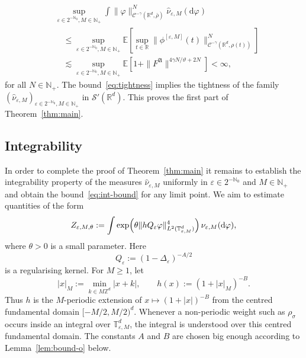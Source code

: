 \documentclass{article}
\numberwithin{equation}{section}
\newcommand{\assign}{:=}
\newcommand{\mathd}{\mathrm{d}}
\theoremstyle{plain}
\theoremstyle{definition}
\begin{document}
\begin{equation}
  \begin{aligned}
    &\sup_{\varepsilon \in 2^{-\mathbb{N}_0}, M \in \mathbb{N}_+}
    \int \| \varphi \|_{\mathcal{C}^{- \gamma}
    (\mathbb{R}^d, \bar{\rho})}^N
    \hat{\nu}_{\varepsilon, M}(\mathd \varphi)\\
    &\quad\leqslant
    \sup_{\varepsilon \in 2^{-\mathbb{N}_0}, M \in \mathbb{N}_+}
    \mathbb{E} \left[\sup_{t \in \mathbb{R}}
    \| \phi^{[\varepsilon, M]} (t) \|_{\mathcal{C}^{- \gamma}
    (\mathbb{R}^d, \rho (t))}^N\right]\\
    &\quad \lesssim
    \sup_{\varepsilon \in 2^{-\mathbb{N}_0}, M \in \mathbb{N}_+}
    \mathbb{E} \left[1 + \| F^{\mathfrak{A}} \|^{4 \gamma N / \vartheta + 2 N}\right]
    < \infty,
  \end{aligned}
  \label{eq:tightness}
\end{equation}
for all $N \in \mathbb{N}_+$. The bound~\eqref{eq:tightness} implies the
tightness of the family $(\hat{\nu}_{\varepsilon, M})_{\varepsilon \in
2^{-\mathbb{N}_0}, M \in \mathbb{N}_+}$ in $\mathcal{S}' (\mathbb R^d)$. This
proves the first part of Theorem~\ref{thm:main}.

\subsection{Integrability}\label{sec:integrability}

In order to complete the proof of Theorem~\ref{thm:main} it remains to
establish the integrability property of the measures
$\hat{\nu}_{\varepsilon, M}$ uniformly in $\varepsilon \in 2^{-\mathbb N_0}$ and $M
\in \mathbb{N}_+$ and obtain the bound~\eqref{eq:int-bound} for any limit
point. We aim to estimate quantities of the form
\[ Z_{\varepsilon, M, \theta} \assign \int \exp\Bigl(\theta \| hQ_{\varepsilon}
\varphi \|_{L^2 (\mathbb{T}^d_{\varepsilon, M})}^4 \Bigr)\,\nu_{\varepsilon, M}
(\mathd \varphi), \]
where $\theta > 0$ is a small parameter.
Here
\begin{equation}
	Q_{\varepsilon} \assign (1 - \Delta_{\varepsilon} )^{- A / 2} \label{eq:Q-A}
\end{equation}
is a regularising kernel. For \(M\geq1\), let
\begin{equation}
	\label{eq:h-B}
	|x|_M\assign\min_{k\in M\mathbb Z^d}|x+k|,
	\qquad
	h(x)\assign(1+|x|_M)^{-B}.
\end{equation}
Thus \(h\) is the \(M\)-periodic extension of
\(x\mapsto(1+|x|)^{-B}\) from the centred fundamental domain
\([-M/2,M/2)^d\).
Whenever a non-periodic weight such as \(\rho_\sigma\) occurs inside an
integral over \(\mathbb T_{\varepsilon,M}^d\), the integral is understood over
this centred fundamental domain.
The constants $A$
and $B$ are chosen big enough according to Lemma~\ref{lem:bound-o} below.
\end{document}
